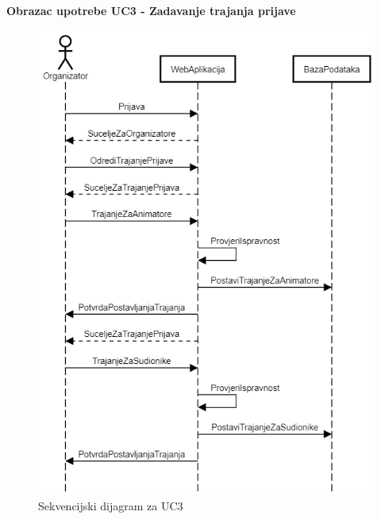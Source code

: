 \newpage
\textbf{Obrazac upotrebe UC3 - Zadavanje trajanja prijave}
\begin{figure}[H]
	\centering
	\includegraphics[scale=0.6]{dijagrami/UC3.PNG}
	\caption{Sekvencijski dijagram za UC3}
	\label{fig: uc3 sekv}
\end{figure}



